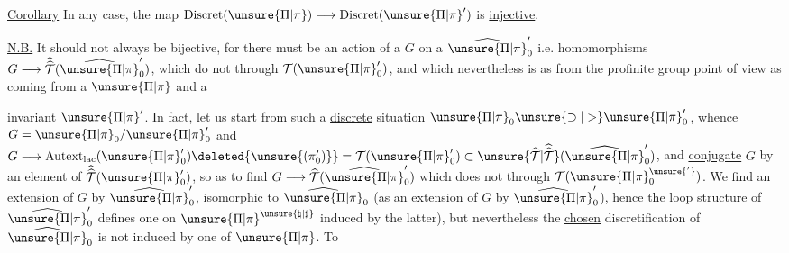 \uline{Corollary} In any case, the map
\(\mathrm{Discret}(\unsure{\Pi|\pi})\longrightarrow\mathrm{Discret}(\unsure{\Pi|\pi}')\)
is \uline{injective}.

\uline{N.B.} It should not always be bijective,
for there must be an  action of a
\(G\) on a \(\widehat{\unsure{\Pi|\pi}}'_0\) i.e. homomorphisms
\(G\longrightarrow\widehat{\widehat{\mathcal T}}(\widehat{\unsure{\Pi|\pi}}'_0)\), which do not 
through \(\mathcal T(\unsure{\Pi|\pi}'_0)\), and which nevertheless is as
 from the profinite group point of view as
 coming from a \(\unsure{\Pi|\pi}\) and a 


invariant $\unsure{\Pi|\pi}'$. In fact, let us start from such a \uline{discrete} situation $\unsure{\Pi|\pi}_0 \unsure{\supset|>} \unsure{\Pi|\pi}'_0$, whence $G=\unsure{\Pi|\pi}_0/\unsure{\Pi|\pi}'_0$ and $G\longrightarrow \operatorname{Autext}_{\mathrm{lac}}(\unsure{\Pi|\pi}'_0)\deleted{\unsure{(\pi'_0)}}=\mathcal T(\unsure{\Pi|\pi}'_0)\subset\unsure{\widehat{\mathcal T}|\widehat{\widehat{\mathcal T}}}(\widehat{\unsure{\Pi|\pi}}'_0)$, and \uline{conjugate} $G$ by an element \inserted{$\gamma$} of $\widehat{\widehat{\mathcal T}}(\unsure{\Pi|\pi}'_0)$, so as to find $G\longrightarrow\widehat{\mathcal T}(\widehat{\unsure{\Pi|\pi}}'_0)$ which does  not  through $\mathcal T(\unsure{\Pi|\pi}^{\unsure{'}}_0)$. We find an extension \inserted{$\unsure{\widehat{\unsure{\Pi|\pi}}|\unsure{\Pi|\pi}}^{\unsure{\natural|\sharp}}$} of $G$ by $\widehat{\unsure{\Pi|\pi}}'_0$, \uline{isomorphic} to $\widehat{\unsure{\Pi|\pi}}_0$ (as an extension of $G$ by $\widehat{\unsure{\Pi|\pi}}'_0$), hence the loop structure of $\widehat{\unsure{\Pi|\pi}}'_0$ defines one on $\unsure{\Pi|\pi}^{\unsure{\natural|\sharp}}$   induced by the latter), but nevertheless the \uline{chosen} discretification  of $\widehat{\unsure{\Pi|\pi}}_0$ is not induced by one of $\unsure{\Pi|\pi}$. To

